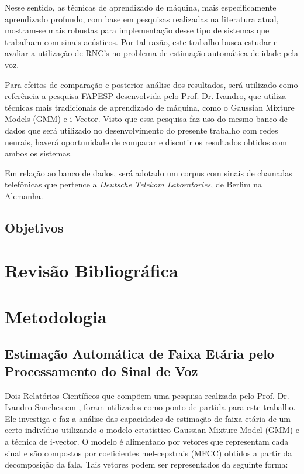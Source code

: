 Nesse sentido, as técnicas de aprendizado de máquina, mais especificamente aprendizado profundo, com base em pesquisas realizadas na literatura atual, mostram-se mais robustas para implementação desse tipo de sistemas que trabalham com sinais acústicos. Por tal razão, este trabalho busca estudar e avaliar a utilização de RNC's no problema de estimação automática de idade pela voz.

Para  efeitos de comparação e posterior análise dos resultados, será utilizado como referência a pesquisa FAPESP desenvolvida pelo Prof. Dr. Ivandro, que utiliza técnicas mais tradicionais de aprendizado de máquina, como o Gaussian Mixture Models (GMM) e i-Vector. Visto que essa pesquisa faz uso do mesmo banco de dados que será utilizado no desenvolvimento do presente trabalho com redes neurais, haverá oportunidade de comparar e discutir os resultados obtidos com ambos os sistemas.

Em relação ao banco de dados, será adotado um corpus com sinais de chamadas telefônicas que pertence a \textit{Deutsche Telekom Laboratories}, de Berlim na Alemanha.

\section{Objetivos}

\chapter{Revisão Bibliográfica}

\chapter{Metodologia}



\section{Estimação Automática de Faixa Etária pelo Processamento do Sinal de Voz}


Dois Relatórios Científicos que compõem uma pesquisa realizada pelo Prof. Dr. Ivandro Sanches em , foram utilizados como ponto de partida para este trabalho.
Ele investiga e faz a análise das capacidades de estimação de faixa etária de um certo indivíduo utilizando o modelo estatístico Gaussian Mixture Model (GMM) e a técnica de i-vector.
O modelo é alimentado por vetores que representam cada sinal e são compostos por coeficientes mel-cepstrais (MFCC) obtidos a partir da decomposição da fala.
Tais vetores podem ser representados da seguinte forma:

